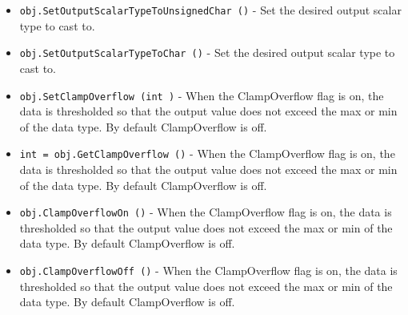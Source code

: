 \begin{itemize}
\item  \verb|obj.SetOutputScalarTypeToUnsignedChar ()| -  Set the desired output scalar type to cast to.

\item  \verb|obj.SetOutputScalarTypeToChar ()| -  Set the desired output scalar type to cast to.

\item  \verb|obj.SetClampOverflow (int )| -  When the ClampOverflow flag is on, the data is thresholded so that
 the output value does not exceed the max or min of the data type.
 By default ClampOverflow is off.

\item  \verb|int = obj.GetClampOverflow ()| -  When the ClampOverflow flag is on, the data is thresholded so that
 the output value does not exceed the max or min of the data type.
 By default ClampOverflow is off.

\item  \verb|obj.ClampOverflowOn ()| -  When the ClampOverflow flag is on, the data is thresholded so that
 the output value does not exceed the max or min of the data type.
 By default ClampOverflow is off.

\item  \verb|obj.ClampOverflowOff ()| -  When the ClampOverflow flag is on, the data is thresholded so that
 the output value does not exceed the max or min of the data type.
 By default ClampOverflow is off.

\end{itemize}
